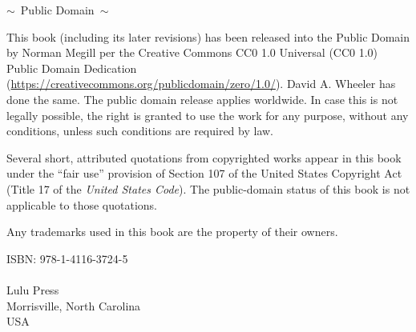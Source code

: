 \begin{center}
$\sim$\ {\sc Public Domain}\ $\sim$

\vspace{2ex}
This book (including its later revisions)
has been released into the Public Domain by Norman Megill per the
Creative Commons CC0 1.0 Universal (CC0 1.0) Public Domain Dedication
(\url{https://creativecommons.org/publicdomain/zero/1.0/}).
David A. Wheeler has done the same.
The public domain release applies worldwide.  In case this is not
legally possible, the right is granted to use the work for any purpose,
without any conditions, unless such conditions are required by law.

\vspace{3ex}
Several short, attributed quotations from copyrighted works
appear in this book under the ``fair use'' provision of Section 107 of
the United States Copyright Act (Title 17 of the {\em United States
Code}).  The public-domain status of this book is not applicable to
those quotations.

\vspace{3ex}
Any trademarks used in this book are the property of their owners.


%
%
%
%

\vspace{7ex}
ISBN: 978-1-4116-3724-5 \\
{\ } \\
Lulu Press \\
Morrisville, North Carolina\\
USA



\end{center}
